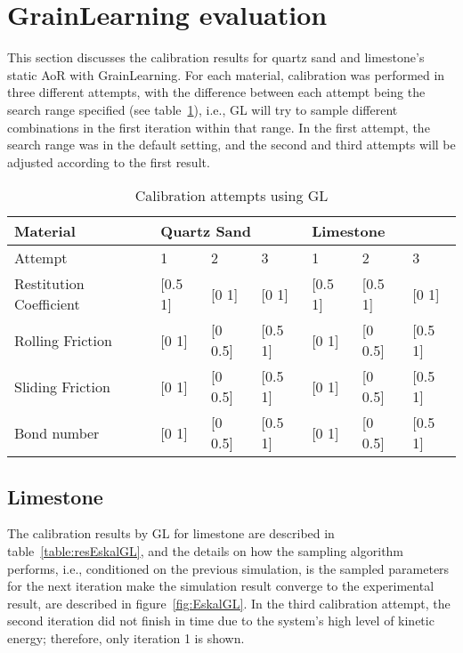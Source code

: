 \section{GrainLearning evaluation}\label{section:GLPerformance} 
 
This section discusses the calibration results for quartz sand and limestone's static AoR with GrainLearning. For each material, calibration was performed in three different attempts, with the difference between each attempt being the search range specified (see table~\ref{table:GLCalibration}), i.e., GL will try to sample different combinations in the first iteration within that range. In the first attempt, the search range was in the default setting, and the second and third attempts will be adjusted according to the first result.

\begin{table}[H]
    \centering
    \begin{tabular}{l|lll|lll}
    Material                & \multicolumn{3}{l|}{Quartz Sand}       & \multicolumn{3}{l}{Limestone}          \\ \hline
    Attempt                 & 1          & 2           & 3           & 1          & 2           & 3           \\ \hline
    Restitution Coefficient & {[}0.5  1{]} & {[}0  1{]}  & {[}0 1{]}   & {[}0.5  1{]} & {[}0.5  1{]}  & {[}0 1{]}   \\
    Rolling Friction        & {[}0 1{]}  & {[}0 0.5{]} & {[}0.5 1{]} & {[}0 1{]}  & {[}0 0.5{]} & {[}0.5 1{]} \\
    Sliding Friction        & {[}0 1{]}  & {[}0 0.5{]} & {[}0.5 1{]} & {[}0 1{]}  & {[}0 0.5{]} & {[}0.5 1{]} \\
    Bond number             & {[}0 1{]}  & {[}0 0.5{]} & {[}0.5 1{]} & {[}0 1{]}  & {[}0 0.5{]} & {[}0.5 1{]} \\
    \end{tabular}
    \caption{Calibration attempts using GL}\label{table:GLCalibration}
\end{table}


\subsection{Limestone}
The calibration results by GL for limestone are described in table~\ref{table:resEskalGL}, and the details on how the sampling algorithm performs, i.e., conditioned on the previous simulation, is the sampled parameters for the next iteration make the simulation result converge to the experimental result, are described in figure~\ref{fig:EskalGL}. In the third calibration attempt, the second iteration did not finish in time due to the system's high level of kinetic energy; therefore, only iteration 1 is shown. 

